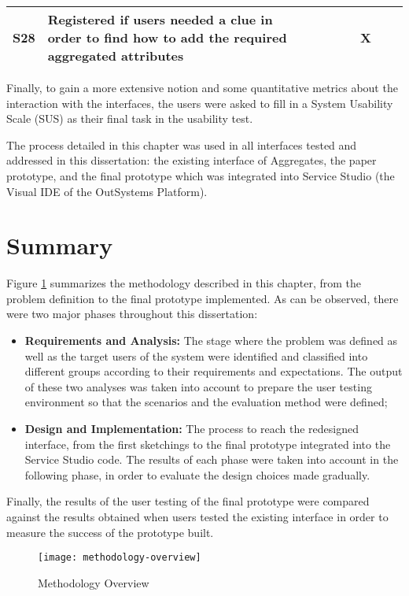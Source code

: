 \begin{longtable}{@{}lm{7cm}ccccccc@{}}
    S28         & Registered if users needed a clue in order to find how to add the required aggregated attributes                                                        &                                                &                                                &                                                &                                                & X                                              &                                                &                                                \\* \bottomrule
    \end{longtable}



Finally, to gain a more extensive notion and some quantitative metrics about the interaction with the interfaces, the users were asked to fill in a System Usability Scale (SUS) \cite{system_usability_scale} as their final task in the usability test.

The process detailed in this chapter was used in all interfaces tested and addressed in this dissertation: the existing interface of Aggregates, the paper prototype, and the final prototype which was integrated into Service Studio (the Visual \gls{IDE} of the OutSystems Platform). 

\section{Summary}
\label{sec:summary}
Figure \ref{fig:methodologyOverview} summarizes the methodology described in this chapter, from the problem definition to the final prototype implemented. As can be observed, there were two major phases throughout this dissertation:

\begin{itemize}
    \item \textbf{Requirements and Analysis: } The stage where the problem was defined as well as the target users of the system were identified and classified into different groups according to their requirements and expectations. The output of these two analyses was taken into account to prepare the user testing environment so that the scenarios and the evaluation method were defined;
    \item \textbf{Design and Implementation: } The process to reach the redesigned interface, from the first sketchings to the final prototype integrated into the Service Studio code. The results of each phase were taken into account in the following phase, in order to evaluate the design choices made gradually.
\end{itemize}

Finally, the results of the user testing of the final prototype were compared against the results obtained when users tested the existing interface in order to measure the success of the prototype built.

\begin{figure}[htbp]
	\centering
	\texttt{[image: methodology-overview]}
	\caption{Methodology Overview}
	\label{fig:methodologyOverview}
\end{figure}